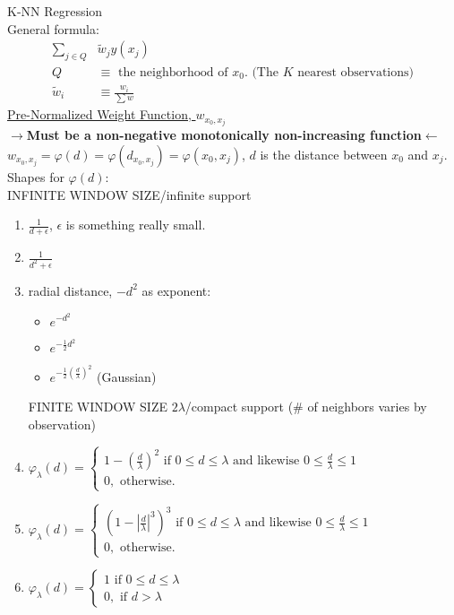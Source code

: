 \documentclass[11pt,letterpaper,english,fleqn]{article} %
\begin{document}
\noindent K-NN Regression
\\
General formula: 
\begin{align*}
\sum\limits_{j \in Q}&\tilde{w}_j y(x_j)\\
Q &\equiv \text{ the neighborhood of }x_0\text{. (The }K\text{ nearest observations)}
\\
\tilde{w}_i &\equiv \frac{w_i}{\sum{w}}
\end{align*}
\underline{Pre-Normalized Weight Function, $w_{x_0, x_j}$}
\\
$\rightarrow$\textbf{Must be a non-negative monotonically non-increasing function}$\leftarrow$
\\
$w_{x_0, x_j} = \varphi(d) = \varphi(d_{x_0, x_j}) = \varphi(x_0, x_j)$, $d$ is the distance between $x_0$ and $x_j$.\medskip 
\\
Shapes for $\varphi(d)$:
\\
\indent\indent INFINITE WINDOW SIZE/infinite support
\begin{enumerate}
\item $\frac{1}{d+\epsilon}$, $\epsilon$ is something really small.
\item $\frac{1}{d^2 + \epsilon}$
\item radial distance, $-d^2$ as exponent: 
\begin{itemize}
\item $e^{-d^2}$
\item $e^{-\frac{1}{2}d^2}$
\item $e^{-\frac{1}{2}\left(\frac{d}{\lambda}\right)^2} $ (Gaussian) 
\end{itemize}
FINITE WINDOW SIZE $2\lambda$/compact support (\# of neighbors varies by observation)
\item $\varphi_\lambda (d) = \begin{cases}
               1 - \left( \frac{d}{\lambda}\right) ^2\text{ if }0 \le d \le \lambda \text{ and likewise } 0 \le \frac{d}{\lambda} \le1\\
               0, \text{ otherwise.}
            \end{cases}$
\item $\varphi_\lambda (d) = \begin{cases}
               \left(1 - \left| \frac{d}{\lambda}\right| ^3 \right) ^3 \text{ if }0 \le d \le \lambda \text{ and likewise } 0 \le \frac{d}{\lambda} \le1\\
               0, \text{ otherwise.}
            \end{cases}$
\item $\varphi_\lambda (d) = \begin{cases}
               1 \text{ if }0 \le d \le \lambda\\
               0, \text{ if } d > \lambda
            \end{cases}$
\end{enumerate}
\end{document}
